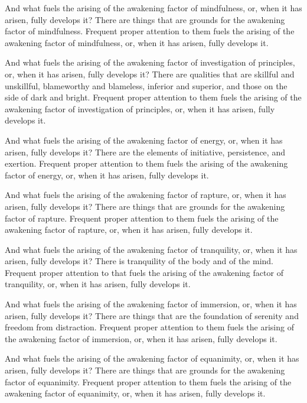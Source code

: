 \documentclass[12pt,openany]{book}%
\begin{document}
And what fuels the arising of the awakening factor of mindfulness, or, when it has arisen, fully develops it? There are things that are grounds for the awakening factor of mindfulness. Frequent proper attention to them fuels the arising of the awakening factor of mindfulness, or, when it has arisen, fully develops it. 

And what fuels the arising of the awakening factor of investigation of principles, or, when it has arisen, fully develops it? There are qualities that are skillful and unskillful, blameworthy and blameless, inferior and superior, and those on the side of dark and bright. Frequent proper attention to them fuels the arising of the awakening factor of investigation of principles, or, when it has arisen, fully develops it. 

And what fuels the arising of the awakening factor of energy, or, when it has arisen, fully develops it? There are the elements of initiative, persistence, and exertion. Frequent proper attention to them fuels the arising of the awakening factor of energy, or, when it has arisen, fully develops it. 

And what fuels the arising of the awakening factor of rapture, or, when it has arisen, fully develops it? There are things that are grounds for the awakening factor of rapture. Frequent proper attention to them fuels the arising of the awakening factor of rapture, or, when it has arisen, fully develops it. 

And what fuels the arising of the awakening factor of tranquility, or, when it has arisen, fully develops it? There is tranquility of the body and of the mind. Frequent proper attention to that fuels the arising of the awakening factor of tranquility, or, when it has arisen, fully develops it. 

And what fuels the arising of the awakening factor of immersion, or, when it has arisen, fully develops it? There are things that are the foundation of serenity and freedom from distraction. Frequent proper attention to them fuels the arising of the awakening factor of immersion, or, when it has arisen, fully develops it. 

And what fuels the arising of the awakening factor of equanimity, or, when it has arisen, fully develops it? There are things that are grounds for the awakening factor of equanimity. Frequent proper attention to them fuels the arising of the awakening factor of equanimity, or, when it has arisen, fully develops it. 
\end{document}
